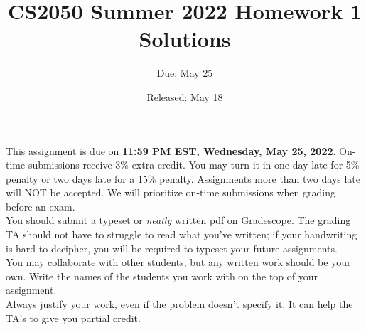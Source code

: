 \documentclass{article}
\title{CS2050 Summer 2022 Homework 1 Solutions}
\author{Due: May 25}
\date{Released: May 18}
\begin{document}
\maketitle

This assignment is due on \textbf{11:59 PM EST, Wednesday, May 25, 2022}.  On-time submissions receive 3\% extra credit. You may turn it in one day late for 5\% penalty or two days late for a 15\% penalty. Assignments more than two days late will NOT be accepted.  We will prioritize on-time submissions when grading before an exam. \\ 

You should submit a typeset or \emph{neatly} written pdf on Gradescope.  The grading TA should not have to struggle to read what you've written; if your handwriting is hard to decipher, you will be required to typeset your future assignments.\\ 

You may collaborate with other students, but any written work should be your own. Write the names of the students you work with on the top of your assignment.\\

Always justify your work, even if the problem doesn't specify it. It can help the TA's to give you partial credit.



\clearpage
\end{document}
